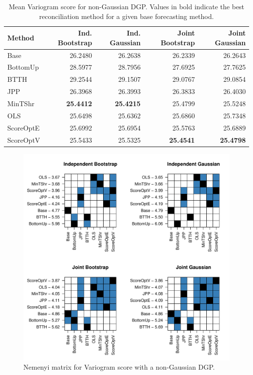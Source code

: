 \documentclass[12pt]{article}
\theoremstyle{definition}
\begin{document}
\begin{table}[H]
	\footnotesize
	\caption{\label{tab:nsv}Mean Variogram score for non-Gaussian DGP.  Values in bold indicate the best reconciliation method for a given base forecasting method.}
	\centering
	\begin{tabular}[t]{l|r|r|r|r}
		\hline
		Method & Ind. Bootstrap & Ind. Gaussian & Joint Bootstrap & Joint Gaussian\\
		\hline
		Base & 26.2480 & 26.2638 & 26.2339 & 26.2643\\
		\hline
		BottomUp & 28.5977 & 28.7956 & 27.6925 & 27.7625\\
		\hline 
		BTTH & 29.2544 & 29.1507 & 29.0767 & 29.0854\\
		\hline
		JPP & 26.3968 & 26.3993 & 26.3833 & 26.4030\\
		\hline
		MinTShr & \textbf{25.4412} & \textbf{25.4215} & 25.4799 & 25.5248\\
		\hline
		OLS & 25.6498 & 25.6362 & 25.6860 & 25.7348\\
		\hline
		ScoreOptE & 25.6992 & 25.6954 & 25.5763 & 25.6889\\
		\hline
		ScoreOptV & 25.5433 & 25.5325 & \textbf{25.4541} & \textbf{25.4798}\\
		\hline
	\end{tabular}
\end{table}

\begin{figure}[H]
	\centering
	\includegraphics[width=.75\textwidth]{Figs/nsv.pdf}
	\caption{Nemenyi matrix for Variogram score with a non-Gaussian DGP.}
	\label{fig:nsv}
\end{figure}	
\end{document}
